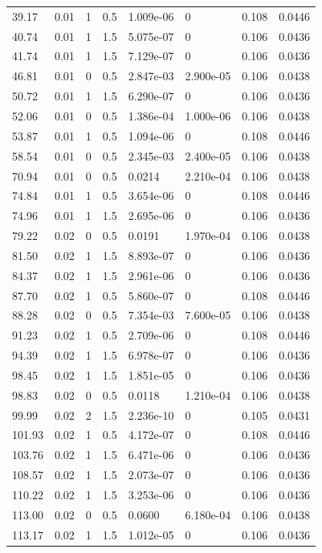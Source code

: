 \documentclass[preview]{standalone}
\begin{document}
{{\begin{tabular}{L{1.2cm}C{1.2cm} C{0.3cm}C{0.5cm} C{1.4cm}C{1.4cm} C{1.4cm}C{1.4cm}}
  39.17  &  0.01  & 1     & 0.5 &  1.009e-06  & 0  & 0.108 &  0.0446   \\ 
  40.74  &  0.01  & 1     & 1.5 &  5.075e-07  & 0  & 0.106 &  0.0436   \\ 
  41.74  &  0.01  & 1     & 1.5 &  7.129e-07  & 0  & 0.106 &  0.0436   \\ 
  46.81  &  0.01  & 0     & 0.5 &  2.847e-03  & 2.900e-05  & 0.106 &  0.0438   \\ 
  50.72  &  0.01  & 1     & 1.5 &  6.290e-07  & 0  & 0.106 &  0.0436   \\ 
  52.06  &  0.01  & 0     & 0.5 &  1.386e-04  & 1.000e-06  & 0.106 &  0.0438   \\ 
  53.87  &  0.01  & 1     & 0.5 &  1.094e-06  & 0  & 0.108 &  0.0446   \\ 
  58.54  &  0.01  & 0     & 0.5 &  2.345e-03  & 2.400e-05  & 0.106 &  0.0438   \\ 
  70.94  &  0.01  & 0     & 0.5 &  0.0214  & 2.210e-04  & 0.106 &  0.0438   \\ 
  74.84  &  0.01  & 1     & 0.5 &  3.654e-06  & 0  & 0.108 &  0.0446   \\ 
  74.96  &  0.01  & 1     & 1.5 &  2.695e-06  & 0  & 0.106 &  0.0436   \\ 
  79.22  &  0.02  & 0     & 0.5 &  0.0191  & 1.970e-04  & 0.106 &  0.0438   \\ 
  81.50  &  0.02  & 1     & 1.5 &  8.893e-07  & 0  & 0.106 &  0.0436   \\ 
  84.37  &  0.02  & 1     & 1.5 &  2.961e-06  & 0  & 0.106 &  0.0436   \\ 
  87.70  &  0.02  & 1     & 0.5 &  5.860e-07  & 0  & 0.108 &  0.0446   \\ 
  88.28  &  0.02  & 0     & 0.5 &  7.354e-03  & 7.600e-05  & 0.106 &  0.0438   \\ 
  91.23  &  0.02  & 1     & 0.5 &  2.709e-06  & 0  & 0.108 &  0.0446   \\ 
  94.39  &  0.02  & 1     & 1.5 &  6.978e-07  & 0  & 0.106 &  0.0436   \\ 
  98.45  &  0.02  & 1     & 1.5 &  1.851e-05  & 0  & 0.106 &  0.0436   \\ 
  98.83  &  0.02  & 0     & 0.5 &  0.0118  & 1.210e-04  & 0.106 &  0.0438   \\ 
  99.99  &  0.02  & 2     & 1.5 &  2.236e-10  & 0  & 0.105 &  0.0431   \\ 
  101.93  &  0.02  & 1     & 0.5 &  4.172e-07  & 0  & 0.108 &  0.0446   \\ 
  103.76  &  0.02  & 1     & 1.5 &  6.471e-06  & 0  & 0.106 &  0.0436   \\ 
  108.57  &  0.02  & 1     & 1.5 &  2.073e-07  & 0  & 0.106 &  0.0436   \\ 
  110.22  &  0.02  & 1     & 1.5 &  3.253e-06  & 0  & 0.106 &  0.0436   \\ 
  113.00  &  0.02  & 0     & 0.5 &  0.0600  & 6.180e-04  & 0.106 &  0.0438   \\ 
  113.17  &  0.02  & 1     & 1.5 &  1.012e-05  & 0  & 0.106 &  0.0436   \\ 
\hline 
\end{tabular} 

}}
\end{document}
